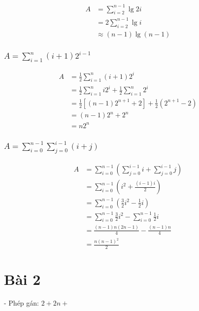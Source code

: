 \documentclass{article}
\begin{document}
\[
\begin{aligned}
A &= \sum_{i=2}^{n-1}\lg 2i \\
&= 2\sum_{i=2}^{n-1}\lg i \\
&\approx (n-1)\lg(n-1)
\end{aligned}
\]

\subsubsection{$A=\sum_{i=1}^{n}(i+1)2^{i-1}$}

\[
\begin{aligned}
A &= \frac{1}{2}\sum_{i=1}^{n}(i+1)2^i \\
&= \frac{1}{2}\sum_{i=1}^{n}i2^i + \frac{1}{2}\sum_{i=1}^{n}2^i \\
&= \frac{1}{2}[(n-1)2^{n+1}+2] +\frac{1}{2}(2^{n+1}-2) \\
&= (n-1)2^n+2^n \\
&= n2^n
\end{aligned}    
\]

\subsubsection{$A=\sum_{i=0}^{n-1}\sum_{j=0}^{i-1}(i+j)$}

\[
\begin{aligned}
A &= \sum_{i=0}^{n-1}(\sum_{j=0}^{i-1}i+\sum_{j=0}^{i-1}j) \\
&= \sum_{i=0}^{n-1}(i^2+\frac{(i-1)i}{2}) \\
&= \sum_{i=0}^{n-1}(\frac{3}{2}i^2-\frac{1}{2}i) \\
&= \sum_{i=0}^{n-1}\frac{3}{2}i^2 - \sum_{i=0}^{n-1}\frac{1}{2}i \\
&= \frac{(n-1)n(2n-1)}{4}-\frac{(n-1)n}{4} \\
&= \frac{n{(n-1)}^2}{2} 
\end{aligned}
\]

\section{Bài 2}
- Phép gán: {$2+2n+$}
\end{document}

